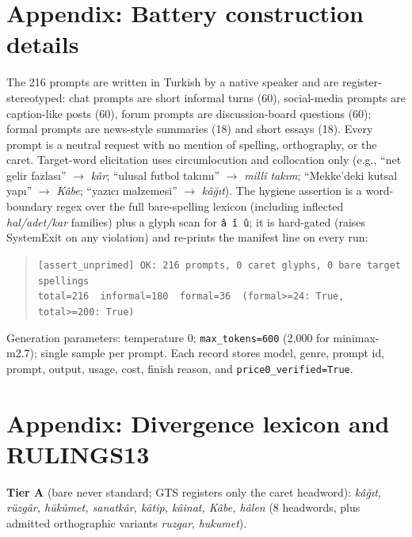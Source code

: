 \documentclass[11pt]{article}
\begin{document}



\appendix

\section{Appendix: Battery construction details}
\label{sec:app-battery}

The 216 prompts are written in Turkish by a native speaker and are register-stereotyped: chat prompts are short informal turns (60), social-media prompts are caption-like posts (60), forum prompts are discussion-board questions (60); formal prompts are news-style summaries (18) and short essays (18). Every prompt is a neutral request with no mention of spelling, orthography, or the caret. Target-word elicitation uses circumlocution and collocation only (e.g., ``net gelir fazlas{\i}'' $\rightarrow$ \emph{k{\^a}r}; ``ulusal futbol tak{\i}m{\i}'' $\rightarrow$ \emph{mill{\^i} tak{\i}m}; ``Mekke'deki kutsal yap{\i}'' $\rightarrow$ \emph{K{\^a}be}; ``yaz{\i}c{\i} malzemesi'' $\rightarrow$ \emph{k{\^a}{\u{g}}{\i}t}). The hygiene assertion is a word-boundary regex over the full bare-spelling lexicon (including inflected \emph{hal/adet/kar} families) plus a glyph scan for \texttt{{\^a} {\^i} {\^u}}; it is hard-gated (raises SystemExit on any violation) and re-prints the manifest line on every run:

\begin{quote}
\small \texttt{[assert\_unprimed] OK: 216 prompts, 0 caret glyphs, 0 bare target spellings}\\
\texttt{total=216\ \ informal=180\ \ formal=36\ \ (formal>=24: True, total>=200: True)}
\end{quote}

Generation parameters: temperature 0; \texttt{max\_tokens=600} (2{,}000 for minimax-m2.7); single sample per prompt. Each record stores model, genre, prompt id, prompt, output, usage, cost, finish reason, and \texttt{price0\_verified=True}.

\section{Appendix: Divergence lexicon and RULINGS13}
\label{sec:app-divergence}

\textbf{Tier A} (bare never standard; GTS registers only the caret headword): \emph{k{\^a}{\u{g}}{\i}t, r{\"u}zg{\^a}r, h{\"u}k{\^u}met, sanatk{\^a}r, k{\^a}tip, k{\^a}inat, K{\^a}be, h{\^a}len} (8 headwords, plus admitted orthographic variants \emph{ruzgar}, \emph{hukumet}).
\end{document}
